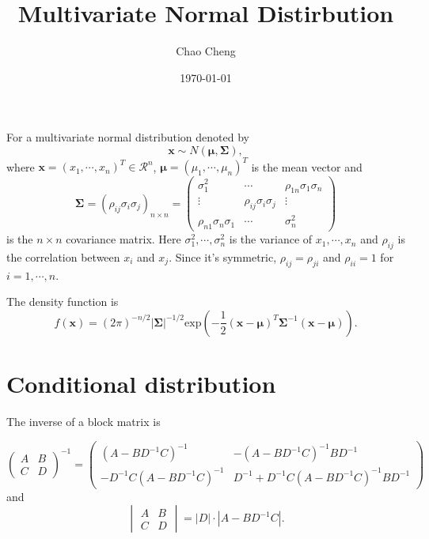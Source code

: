 \documentclass[a4paper,12pt]{article}
\title{Multivariate Normal Distirbution}
\author{Chao Cheng}
\date{\today}
\begin{document}
\maketitle

For a multivariate normal distribution denoted by
\[
  \bm{x} \sim
  N\left(
    \bm{\mu}, \bm{\Sigma}
  \right)
  ,
\]
where $\bm{x} = \left(x_1, \cdots, x_n\right)^T\in\mathcal{R}^n$, $\bm{\mu} = \left(\mu_1, \cdots, \mu_n\right)^T$ is the mean vector and
\[
  \bm{\Sigma} = \left(
    \rho_{ij}\sigma_i\sigma_j
  \right)_{n\times n}
  =
  \begin{pmatrix}
    \sigma_1^2 & \cdots & \rho_{1n}\sigma_1\sigma_n    \\
    \vdots & \rho_{ij}\sigma_i\sigma_j & \vdots    \\
    \rho_{n1}\sigma_n\sigma_1 & \cdots & \sigma_n^2
  \end{pmatrix}
\]
is the $n\times n$ covariance matrix. Here $\sigma_1^2, \cdots, \sigma_n^2$ is the variance of $x_1, \cdots, x_n$ and $\rho_{ij}$ is the correlation between $x_i$ and $x_j$. Since it's symmetric, $\rho_{ij} = \rho_{ji}$ and $\rho_{ii} = 1$ for $i = 1, \cdots, n$.
\par
The density function is
\[
  f\left(\bm{x}\right) =
  \left(2\pi\right)^{-n / 2}
  \left|\bm{\Sigma}\right|^{-1 / 2}
  \mathrm{exp}\left(
    -\frac{1}{2}
    \left(\bm{x} - \bm{\mu}\right)^T
    \bm{\Sigma}^{-1}
    \left(\bm{x} - \bm{\mu}\right)
  \right)
  .
\]

\section{Conditional distribution}
\label{sec:cond-distr}

The inverse of a block matrix is

\[
  \begin{pmatrix}
    A & B    \\
    C & D
  \end{pmatrix}^{-1}
  =
  \begin{pmatrix}
    \left( A - BD^{-1}C \right)^{-1} &  - \left( A - BD^{-1}C \right)^{-1}BD^{-1}    \\
    -D^{-1}C\left( A - BD^{-1}C \right)^{-1} & D^{-1} + D^{-1}C\left( A - BD^{-1}C \right)^{-1}BD^{-1}
  \end{pmatrix}
\]
and
\[
  \begin{vmatrix}
    A & B    \\
    C & D
  \end{vmatrix}
  = \left|D\right| \cdot \left|A - BD^{-1}C\right|
  .
\]
\end{document}
